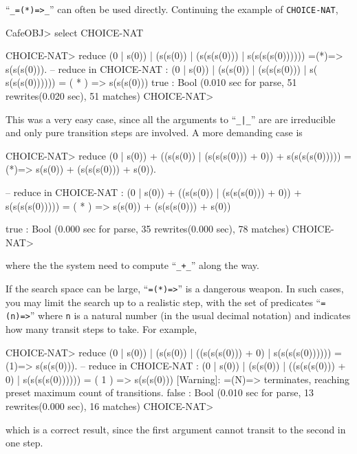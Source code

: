 \documentclass[a4paper]{memoir}
\begin{document}
``\verb|_=(*)=>_|'' can often be used directly.
Continuing the example of \verb|CHOICE-NAT|,
\begin{vvtm}
\begin{ccode}
  CafeOBJ> select CHOICE-NAT

  CHOICE-NAT> reduce (0 | s(0)) | (s(s(0)) | (s(s(s(0))) | s(s(s(s(0)))))) 
    =(*)=> s(s(s(0))).
  -- reduce in CHOICE-NAT : (0 | s(0)) | (s(s(0)) | (s(s(s(0))) | s(
     s(s(s(0)))))) = ( * ) => s(s(s(0)))
  true : Bool
  (0.010 sec for parse, 51 rewrites(0.020 sec), 51 matches)
  CHOICE-NAT>
\end{ccode}
\end{vvtm}
This was a very easy case, since all the arguments to ``\verb+_|_+'' are
are irreducible and only pure transition steps are involved.
A more demanding case is
\begin{vvtm}
\begin{ccode}
  CHOICE-NAT> reduce (0 | s(0)) + ((s(s(0)) | (s(s(s(0))) + 0)) 
    + s(s(s(s(0))))) =(*)=> s(s(0)) + (s(s(s(0))) + s(0)).

  -- reduce in CHOICE-NAT : (0 | s(0)) + ((s(s(0)) | (s(s(s(0))) + 
      0)) + s(s(s(s(0))))) = ( * ) => s(s(0)) + (s(s(s(0))) + s(0))
    
  true : Bool
  (0.000 sec for parse, 35 rewrites(0.000 sec), 78 matches)
  CHOICE-NAT> 
\end{ccode}
\end{vvtm}
where the the system need to compute ``\verb|_+_|'' along the way.

If the search space can be large, ``\verb|=(*)=>|'' is a dangerous weapon.
In such cases, you may limit the search up to a realistic step, with
the set of predicates ``\verb|=(n)=>|'' where \verb|n| is a natural
number (in the usual decimal notation) and indicates how many transit
steps to take. For example,
\begin{vvtm}
\begin{ccode}
  CHOICE-NAT> reduce (0 | s(0)) | (s(s(0)) | ((s(s(s(0))) + 0) |
    s(s(s(s(0)))))) =(1)=> s(s(s(0))).
  -- reduce in CHOICE-NAT : (0 | s(0)) | (s(s(0)) | ((s(s(s(0))) + 
       0) | s(s(s(s(0)))))) = ( 1 ) => s(s(s(0)))
  [Warning]: =(N)=> terminates, reaching preset maximum count of transitions.
  false : Bool
  (0.010 sec for parse, 13 rewrites(0.000 sec), 16 matches)
  CHOICE-NAT>
\end{ccode}
\end{vvtm}
which is a correct result, since the first argument cannot transit to
the second in one step.
\end{document}
